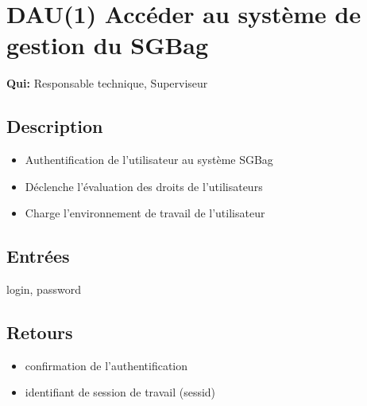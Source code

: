 \newcommand\urt{Responsable technique}
\newcommand\us{Superviseur}
\newcommand\fatal{(Erreur fatale)}
\newcommand\warning{(message d'avertissement)}
\newcommand\event{u-Événement}
\newcommand\syslog{u-Données d'exploitation}
\newcommand\allobjs{u-Aéroport, u-Avion, u-Terminal, u-Hall, u-Chemin de connexion entre les halls, u-Gichet d'enregistrement,
u-Bagage, u-Chariot, u-Rail, u-Zone de contrôle de sécurité automatique, u-Zone de contrôle de sécurité
manuelle, u-Portique, u-Voie de garage, u-Zone de chargement des batteries, u-Zone embarquement, u-Tapis roulant,
u-Train, u-Wagonnet, u-Container, u-Plateau élévateur, u-Zone de déchargement, u-Tobogan, u-Zone de retrait des bagages,
u-Carrousel, u-Zone de maintenance, u-Aiguillage, u-Chemin de roulement, u-Événement, u-Données d'exploitation}
\newcommand\circobjs{u-Zone*, u-Bagage, u-Chariot, u-Voie de garage, u-Tapis roulant, u-Train, u-Rail, u-Wagonnet, u-Container,
u-Plateau Élévateur, u-Tobogan, u-Carrousel, u-Aiguillage, u-Chemin de roulement}
\newcommand\autobjs{u-Guichet d'enregistrement, u-Chariot, u-Portique, u-Tapis roulant, u-Train, u-Plateau élévateur, u-Tobogan,
u-Carrousel, u-Chemin de roulement, \event}

\section{DAU(1) Accéder au système de gestion du SGBag}
	\textbf{Qui:} \urt, \us

	\subsection{Description}
	\begin{itemize}
		\item Authentification de l'utilisateur au système SGBag
		\item Déclenche l'évaluation des droits de l'utilisateurs
		\item Charge l'environnement de travail de l'utilisateur
	\end{itemize}

	\subsection{Entrées}
		login, password

	\subsection{Retours}
	\begin{itemize}
		\item confirmation de l'authentification
		\item identifiant de session de travail (sessid)
	\end{itemize}

